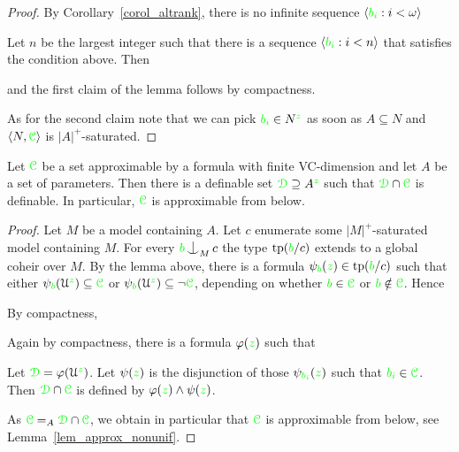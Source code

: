 \begin{proof}
  By Corollary~\ref{corol_altrank}, there is no infinite sequence $\langle{\color{green}b_i}:i<\omega\rangle$


Let $n$ be the largest integer such that there is a sequence $\langle{\color{green}b_i}:i<n\rangle$ that satisfies the condition above. Then


and the first claim of the lemma follows by compactness. 

As for the second claim note that we can pick ${\color{green} b_i}\in N^{\color{green} z}$ as soon as $A\subseteq N$ and $\langle N,{\color{green}\EuScript C}\rangle$ is $|A|^+$-saturated.
\end{proof}

\begin{corollary}\label{corol_honest}
  Let ${\color{green}\EuScript C}$ be a set approximable by a formula with finite VC-dimension and let $A$ be a set of parameters.
  Then there is a definable set ${\color{green}\EuScript D}\supseteq A^{\color{green} z}$ such that ${\color{green}\EuScript D}\cap{\color{green}\EuScript C}$ is definable.
  In particular, ${\color{green}\EuScript C}$ is approximable from below.
\end{corollary}

\begin{proof}
  Let $M$ be a model containing $A$.
  Let $c$ enumerate some $|M|^+$-saturated model containing $M$.
  For every ${\gr b}\nonfork_Mc$ the type ${\rm tp}({\color{green} b}/c)$ extends to a global coheir over $M$. 
  By the lemma above, there is a formula $\psi_{\color{green} b}({\color{green} z})\in{\rm tp}({\color{green} b}/c)$ such that either $\psi_{\color{green} b}(\EuScript U^{\color{green} z})\subseteq{\color{green}\EuScript C}$ or $\psi_{\color{green} b}(\EuScript U^{\color{green} z})\subseteq\neg{\color{green}\EuScript C}$, depending on whether ${\color{green} b}\in{\color{green}\EuScript C}$ or ${\color{green} b}\notin{\color{green}\EuScript C}$.
  Hence


  By compactness,
  

  Again by compactness, there is a formula $\varphi({\color{green} z})$ such that 
  

  Let ${\color{green}\EuScript D}=\varphi(\EuScript U^{\color{green} z})$.
  Let $\psi({\color{green} z})$ is the disjunction of those $\psi_{\color{green} b_i}({\color{green} z})$ such that ${\color{green} b_i}\in {\color{green}\EuScript C}$.
  Then  ${\color{green}\EuScript D}\cap{\color{green}\EuScript C}$ is defined by $\varphi({\color{green} z})\wedge\psi({\color{green} z})$.

  As ${\color{green}\EuScript C}=_A{\color{green}\EuScript D}\cap{\color{green}\EuScript C}$, we obtain in particular that ${\color{green}\EuScript C}$ is approximable from below, see Lemma~\ref{lem_approx_nonunif}.
\end{proof}

